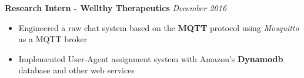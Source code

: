 \documentclass{article}
\begin{document}
\textbf{Research Intern - Wellthy Therapeutics } \hfill{\sl \small December 2016}
  \vspace{1pt}\\
  \vspace{-17pt}
  \begin{itemize}[itemsep = -0.75 mm, leftmargin=*]
      \item Engineered a raw chat system based on the \textbf{MQTT} protocol using \emph{Mosquitto} as a MQTT broker
      \item Implemented User-Agent assignment system with Amazon's \textbf{Dynamodb} database and other web services
  \end{itemize}
\vspace{-12pt}
\end{document}
